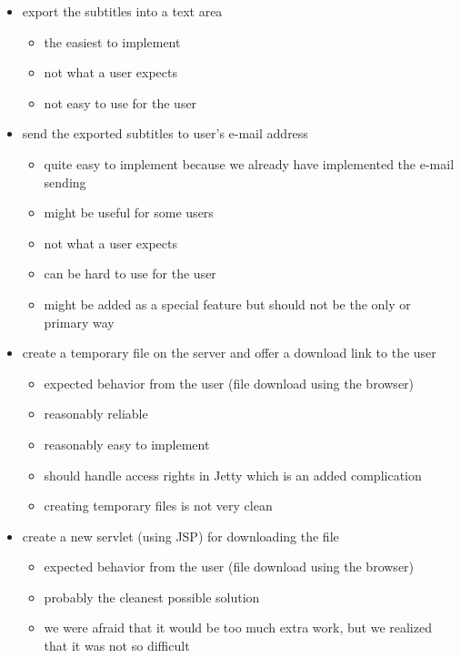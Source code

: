 {\begin{itemize}

\item export the subtitles into a text area
\begin{itemize}
\item the easiest to implement
\item not what a user expects
\item not easy to use for the user
\end{itemize}

\item send the exported subtitles to user's e-mail address
\begin{itemize}
\item quite easy to implement because we already have implemented the e-mail sending
\item might be useful for some users
\item not what a user expects
\item can be hard to use for the user
\item might be added as a special feature but should not be the only or primary way
\end{itemize}

\item create a temporary file on the server and offer a download link to the user
\begin{itemize}
\item expected behavior from the user (file download using the browser)
\item reasonably reliable
\item reasonably easy to implement
\item should handle access rights in Jetty which is an added complication
\item creating temporary files is not very clean
\end{itemize}

\item create a new servlet (using JSP) for downloading the file
\begin{itemize}
\item expected behavior from the user (file download using the browser)
\item probably the cleanest possible solution
\item we were afraid that it would be too much extra work, but we realized that it was not so difficult
\end{itemize}

\end{itemize}

}
